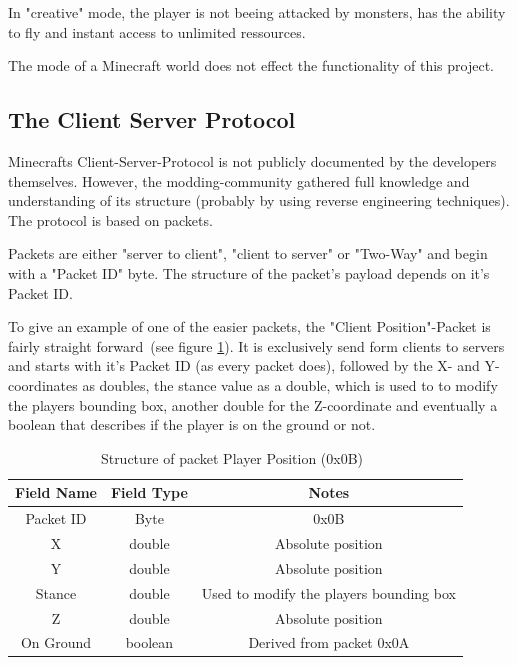 In "creative" mode, the player is not beeing attacked by monsters, has the ability to fly and instant access to unlimited ressources.

The mode of a Minecraft world does not effect the functionality of this project.

        \subsection{The Client Server Protocol}
Minecrafts Client-Server-Protocol is not publicly documented by the developers themselves. However, the modding-community gathered full knowledge and understanding of its structure (probably by using reverse engineering techniques). The protocol is based on packets. 

Packets are either "server to client", "client to server" or "Two-Way" and begin with a "Packet ID" byte. The structure of the packet's payload depends on it's Packet ID.
 
To give an example of one of the easier packets, the "Client Position"-Packet is fairly straight forward~(see figure \ref{mc_packet}). It is exclusively send form clients to servers and starts with it's Packet ID (as every packet does), followed by the X- and Y-coordinates as doubles, the stance value as a double, which is used to to modify the players bounding box, another double for the Z-coordinate and eventually a boolean that describes if the player is on the ground or not.~\cite{protocol}

\begin{table}[htb]
\centering
\begin{tabular}{|c|c|c|}\hline

    Field Name & Field Type & Notes \\ \hline
   Packet ID & Byte & 0x0B \\ \hline
   X & double & Absolute position \\ \hline
   Y & double & Absolute position \\ \hline
   Stance & double & Used to modify the players bounding box \\ \hline
   Z & double & Absolute position \\ \hline
   On Ground & boolean & Derived from packet 0x0A \\ \hline
   

 \end{tabular}
       \caption{Structure of packet Player Position (0x0B)~\cite{protocol}}
  \label{mc_packet}
  \end{table}

